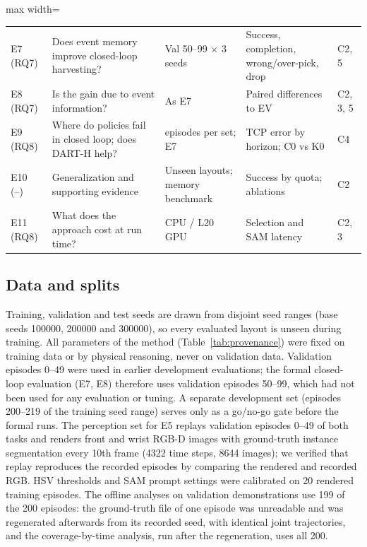 \begin{table}[t]
\begin{adjustbox}{max width=\textwidth}
\begin{tabular}{>{\raggedright\arraybackslash}p{1.45cm}>{\raggedright\arraybackslash}p{4.5cm}>{\raggedright\arraybackslash}p{3.2cm}>{\raggedright\arraybackslash}p{3.4cm}>{\raggedright\arraybackslash}p{1.0cm}}
E7 (RQ7) & Does event memory improve closed-loop harvesting? & Val 50--99 $\times$ 3 seeds & Success, completion, wrong/over-pick, drop & C2, 5\\
E8 (RQ7) & Is the gain due to event information? & As E7 & Paired differences to EV & C2, 3, 5\\
E9 (RQ8) & Where do policies fail in closed loop; does DART-H help? & 10 episodes per set; E7 & TCP error by horizon; C0 vs K0 & C4\\
E10 (--) & Generalization and supporting evidence & Unseen layouts; memory benchmark & Success by quota; ablations & C2\\
E11 (RQ8) & What does the approach cost at run time? & CPU / L20 GPU & Selection and SAM latency & C2, 3\\
\bottomrule
\end{tabular}\end{adjustbox}
\end{table}

\subsection{Data and splits}
\label{sec:splits}
Training, validation and test seeds are drawn from disjoint seed ranges (base seeds 100000, 200000 and 300000), so every evaluated layout is unseen during training. All parameters of the method (Table~\ref{tab:provenance}) were fixed on training data or by physical reasoning, never on validation data. Validation episodes 0--49 were used in earlier development evaluations; the formal closed-loop evaluation (E7, E8) therefore uses validation episodes 50--99, which had not been used for any evaluation or tuning. A separate development set (episodes 200--219 of the training seed range) serves only as a go/no-go gate before the formal runs. The perception set for E5 replays validation episodes 0--49 of both tasks and renders front and wrist RGB-D images with ground-truth instance segmentation every 10th frame (4322 time steps, 8644 images); we verified that replay reproduces the recorded episodes by comparing the rendered and recorded RGB. HSV thresholds and SAM prompt settings were calibrated on 20 rendered training episodes. The offline analyses on validation demonstrations use 199 of the 200 episodes: the ground-truth file of one episode was unreadable and was regenerated afterwards from its recorded seed, with identical joint trajectories, and the coverage-by-time analysis, run after the regeneration, uses all 200.

